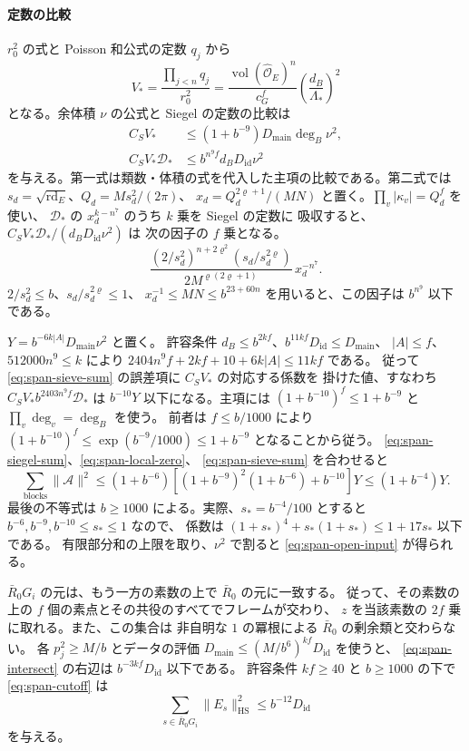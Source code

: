 \paragraph{定数の比較}
\(r_0^2\) の式と Poisson 和公式の定数 \(q_j\) から
\[
 V_\ast=\frac{\prod_{j<n}q_j}{r_0^2}
 =\frac{\operatorname{vol}(\widehat{\mathcal O}_E)^n}{c_G^f}
    \left(\frac{d_B}{\Lambda_\ast}\right)^2
\]
となる。余体積 \(\nu\) の公式と Siegel の定数の比較は
\[
 \begin{split}
 C_S V_\ast
  &\le(1+b^{-9})D_{\mathrm{main}}\deg_B\nu^2,\\
 C_S V_\ast\mathcal D_\ast
  &\le b^{n^9f}d_BD_{\mathrm{id}}\nu^2
 \end{split}
\]
を与える。第一式は類数・体積の式を代入した主項の比較である。第二式では
\(s_d=\sqrt{\operatorname{rd}_E}\)、\(Q_d=Ms_d^2/(2\pi)\)、
\(x_d=Q_d^{2\varrho+1}/(MN)\) と置く。\(\prod_v|\kappa_v|=Q_d^f\) を使い、
\(\mathcal D_\ast\) の \(x_d^{k-n^7}\) のうち \(k\) 乗を Siegel の定数に
吸収すると、\(C_SV_\ast\mathcal D_\ast/(d_BD_{\mathrm{id}}\nu^2)\) は
次の因子の \(f\) 乗となる。
\[
 \frac{(2/s_d^2)^{n+2\varrho^2}(s_d/s_d^{2\varrho})}
      {2M^{\varrho(2\varrho+1)}}\,x_d^{-n^7}.
\]
\(2/s_d^2\le b\)、\(s_d/s_d^{2\varrho}\le1\)、
\(x_d^{-1}\le MN\le b^{23+60n}\) を用いると、この因子は \(b^{n^9}\) 以下である。

\(Y=b^{-6k|A|}D_{\mathrm{main}}\nu^2\) と置く。
許容条件 \(d_B\le b^{2kf}\)、\(b^{11kf}D_{\mathrm{id}}\le D_{\mathrm{main}}\)、
\(|A|\le f\)、\(512000n^9\le k\) により
\(2404n^9f+2kf+10+6k|A|\le11kf\) である。
従って \eqref{eq:span-sieve-sum} の誤差項に \(C_SV_\ast\) の対応する係数を
掛けた値、すなわち \(C_SV_\ast b^{2403n^9f}\mathcal D_\ast\) は
\(b^{-10}Y\) 以下になる。主項には
\((1+b^{-10})^f\le1+b^{-9}\) と \(\prod_v\deg_v=\deg_B\) を使う。
前者は \(f\le b/1000\) により \((1+b^{-10})^f\le
\exp(b^{-9}/1000)\le1+b^{-9}\) となることから従う。
\eqref{eq:span-siegel-sum}、\eqref{eq:span-local-zero}、
\eqref{eq:span-sieve-sum} を合わせると
\[
 \sum_{\mathrm{blocks}}\|\mathcal A\|^2
 \le (1+b^{-6})\left[(1+b^{-9})^2(1+b^{-6})+b^{-10}\right]Y
 \le (1+b^{-4})Y .
\]
最後の不等式は \(b\ge1000\) による。実際、\(s_*=b^{-4}/100\) とすると
\(b^{-6},b^{-9},b^{-10}\le s_*\le1\) なので、
係数は \((1+s_*)^4+s_*(1+s_*)\le1+17s_*\) 以下である。
有限部分和の上限を取り、\(\nu^2\) で割ると
\eqref{eq:span-open-input} が得られる。

\(\bar R_0G_i\) の元は、もう一方の素数の上で \(\bar R_0\) の元に一致する。
従って、その素数の上の \(f\) 個の素点とその共役のすべてでフレームが交わり、
\(z\) を当該素数の \(2f\) 乗に取れる。また、この集合は
非自明な \(1\) の冪根による \(\bar R_0\) の剰余類と交わらない。
各 \(p_j^2\geq M/b\) とデータの評価
\(D_{\mathrm{main}}\le (M/b^6)^{kf}D_{\mathrm{id}}\) を使うと、
\eqref{eq:span-intersect} の右辺は \(b^{-3kf}D_{\mathrm{id}}\) 以下である。
許容条件 \(kf\geq 40\) と \(b\ge 1000\) の下で \eqref{eq:span-cutoff} は
\begin{equation}\label{eq:span-bessel-near}
 \sum_{s\in\bar R_0G_i}\|E_s\|_{\mathrm{HS}}^2
 \leq b^{-12}D_{\mathrm{id}}
\end{equation}
を与える。

